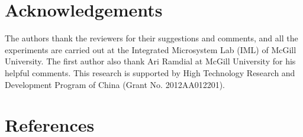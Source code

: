 \documentclass[preprint]{elsarticle}
\begin{document}
\section*{Acknowledgements}
The authors thank the reviewers for their suggestions and comments, and all the experiments are carried out at the Integrated Microsystem Lab (IML) of McGill University. The first author also thank Ari Ramdial at McGill University for his helpful comments. This research is supported by High Technology
Research and Development Program of China (Grant No. 2012AA012201).


\section*{References}


\end{document}
